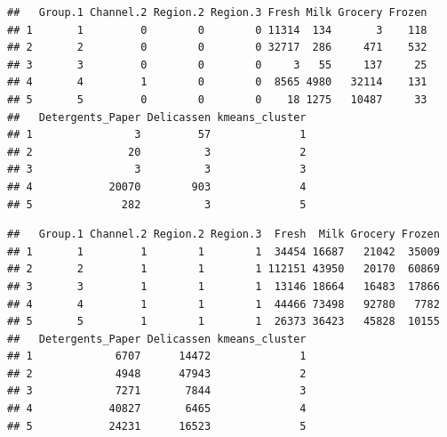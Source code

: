 \documentclass[
  english,
  man]{apa6}
\newenvironment{Shaded}{\begin{snugshade}}{\end{snugshade}}
\newcommand{\CommentTok}[1]{\textcolor[rgb]{0.56,0.35,0.01}{\textit{#1}}}
\newcommand{\KeywordTok}[1]{\textcolor[rgb]{0.13,0.29,0.53}{\textbf{#1}}}
\newcommand{\NormalTok}[1]{#1}
\newcommand{\OperatorTok}[1]{\textcolor[rgb]{0.81,0.36,0.00}{\textbf{#1}}}
\begin{document}
\begin{Shaded}
\end{Shaded}

\begin{verbatim}
##   Group.1 Channel.2 Region.2 Region.3 Fresh Milk Grocery Frozen
## 1       1         0        0        0 11314  134       3    118
## 2       2         0        0        0 32717  286     471    532
## 3       3         0        0        0     3   55     137     25
## 4       4         1        0        0  8565 4980   32114    131
## 5       5         0        0        0    18 1275   10487     33
##   Detergents_Paper Delicassen kmeans_cluster
## 1                3         57              1
## 2               20          3              2
## 3                3          3              3
## 4            20070        903              4
## 5              282          3              5
\end{verbatim}

\begin{Shaded}
\end{Shaded}

\begin{verbatim}
##   Group.1 Channel.2 Region.2 Region.3  Fresh  Milk Grocery Frozen
## 1       1         1        1        1  34454 16687   21042  35009
## 2       2         1        1        1 112151 43950   20170  60869
## 3       3         1        1        1  13146 18664   16483  17866
## 4       4         1        1        1  44466 73498   92780   7782
## 5       5         1        1        1  26373 36423   45828  10155
##   Detergents_Paper Delicassen kmeans_cluster
## 1             6707      14472              1
## 2             4948      47943              2
## 3             7271       7844              3
## 4            40827       6465              4
## 5            24231      16523              5
\end{verbatim}

\begin{Shaded}
\end{Shaded}
\end{document}
